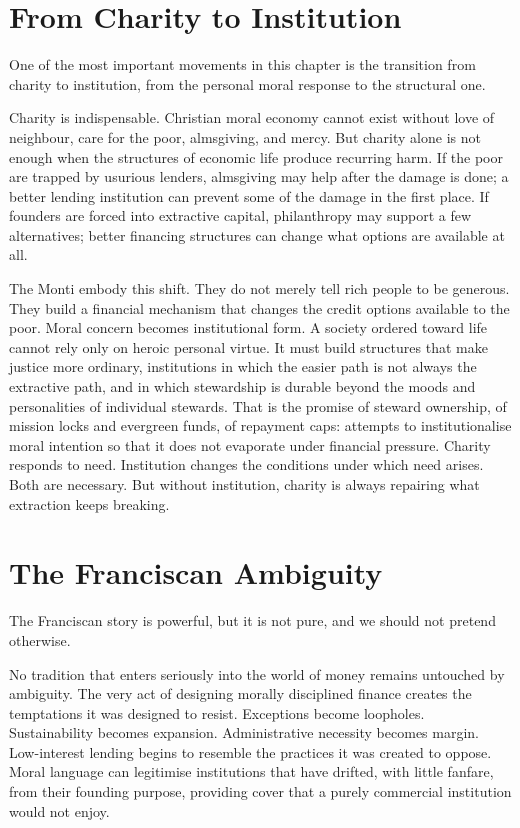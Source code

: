 \documentclass[11pt,a4paper,oneside]{book}
\begin{document}
\section*{From Charity to Institution}

One of the most important movements in this chapter is the transition from charity to institution, from the personal moral response to the structural one.

Charity is indispensable. Christian moral economy cannot exist without love of neighbour, care for the poor, almsgiving, and mercy. But charity alone is not enough when the structures of economic life produce recurring harm. If the poor are trapped by usurious lenders, almsgiving may help after the damage is done; a better lending institution can prevent some of the damage in the first place. If founders are forced into extractive capital, philanthropy may support a few alternatives; better financing structures can change what options are available at all.

The Monti embody this shift. They do not merely tell rich people to be generous. They build a financial mechanism that changes the credit options available to the poor. Moral concern becomes institutional form. A society ordered toward life cannot rely only on heroic personal virtue. It must build structures that make justice more ordinary, institutions in which the easier path is not always the extractive path, and in which stewardship is durable beyond the moods and personalities of individual stewards. That is the promise of steward ownership, of mission locks and evergreen funds, of repayment caps: attempts to institutionalise moral intention so that it does not evaporate under financial pressure. Charity responds to need. Institution changes the conditions under which need arises. Both are necessary. But without institution, charity is always repairing what extraction keeps breaking.

\section*{The Franciscan Ambiguity}

The Franciscan story is powerful, but it is not pure, and we should not pretend otherwise.

No tradition that enters seriously into the world of money remains untouched by ambiguity. The very act of designing morally disciplined finance creates the temptations it was designed to resist. Exceptions become loopholes. Sustainability becomes expansion. Administrative necessity becomes margin. Low-interest lending begins to resemble the practices it was created to oppose. Moral language can legitimise institutions that have drifted, with little fanfare, from their founding purpose, providing cover that a purely commercial institution would not enjoy.
\end{document}
